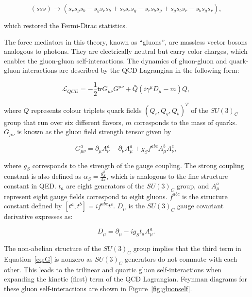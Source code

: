\begin{equation}
(sss)\rightarrow(s_{r}s_{g}s_{b}-s_{g}s_{r}s_{b}+s_{b}s_{r}s_{g}-s_{r}s_{b}s_{g}+s_{g}s_{b}s_{r}-s_{b}s_{g}s_{r}),
\end{equation}

which restored the Fermi-Dirac statistics.  

The force mediators in this theory, known as ``gluons'', are massless vector bosons analogous to photons. They are electrically neutral but carry color charges, which enables the gluon-gluon self-interactions. The dynamics of gluon-gluon and quark-gluon interactions are described by the \ac{QCD} Lagrangian in the following form:

\begin{equation}
\mathcal{L}_{QCD}=-\frac{1}{2}\textsf{tr}G_{\mu\nu}G^{\mu\nu}+\bar{Q}(i\gamma^{\mu}D_{\mu}-m)Q,
\end{equation}

where $Q$ represents colour triplets quark fields $(Q_{r},Q_{g},Q_{b})^{T}$ of the $SU(3)_{C}$ group that run over six different flavors, $m$ corresponds to the mass of quarks. $G_{\mu\nu}$ is known as the gluon field strength tensor given by

\begin{equation}
\label{eq:G}
G_{\mu\nu}^{a}=\partial_{\mu}A_{\nu}^{a}-\partial_{\nu}A_{\mu}^{a}+g_{S}f^{abc}A_{\mu}^{b}A_{\nu}^{c},
\end{equation}

where $g_{S}$ corresponds to the strength of the gauge coupling. The strong coupling constant is also defined as $\alpha_{S}=\frac{g_{S}^2}{4\pi}$, which is analogous to the fine structure constant in \ac{QED}. $t_{a}$ are eight generators of the $SU(3)_{C}$ group, and $A^{a}_{\mu}$ represent eight gauge fields correspond to eight gluons. $f^{abc}$ is the structure constant defined by $[t^{a},t^{b}]=if^{abc}t^{c}$. $D_{\mu}$ is the $SU(3)_{C}$ gauge covariant derivative expresses as:

\begin{equation}
D_{\mu}=\partial_{\mu}-ig_{S}t_{a}A^{a}_{\mu}.
\end{equation}

The non-abelian structure of the $SU(3)_{C}$ group implies that the third term in Equation~\ref{eq:G} is nonzero as $SU(3)_{C}$ generators do not commute with each other. This leads to the trilinear and quartic gluon self-interactions when expanding the kinetic (first) term of the \ac{QCD} Lagrangian. Feynman diagrams for these gluon self-interactions are shown in Figure~\ref{fig:gluonself}.


